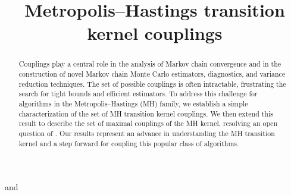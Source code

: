 \documentclass[aihp]{imsart}
\theoremstyle{plain}
\theoremstyle{remark}
\theoremstyle{definition} \newtheorem{example}{Example}
\begin{document}
\begin{frontmatter}
\title{Metropolis--Hastings transition kernel couplings}

\begin{aug}
	\author[a]{ } and
	\author[b]{ }

	\address[a]{Tudor Investment Corporation, }
	\address[b]{Department of Statistics, Rutgers University, }
\end{aug}

\begin{abstract}
Couplings play a central role in the analysis of Markov chain convergence and in the construction of
novel Markov chain Monte Carlo estimators, diagnostics, and variance reduction techniques. The set
of possible couplings is often intractable, frustrating the search for tight bounds and efficient
estimators. To address this challenge for algorithms in the Metropolis--Hastings (MH) family, we
establish a simple characterization of the set of MH transition kernel couplings. We then extend
this result to describe the set of maximal couplings of the MH kernel, resolving an open question of
\citet{OLeary2020}. Our results represent an advance in understanding the MH transition kernel and a
step forward for coupling this popular class of algorithms.
\end{abstract}

\begin{keyword}[class=MSC]
\end{keyword}

\begin{keyword}
\end{keyword}

\end{frontmatter}
\end{document}
